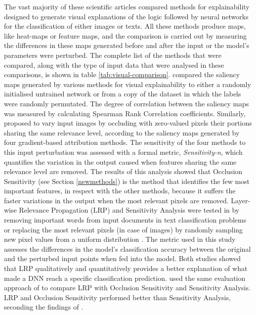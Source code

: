 \documentclass[final,1p,times]{elsarticle}
\begin{document}
The vast majority of these scientific articles compared methods for explainability designed to generate visual explanations of the logic followed by neural networks for the classification of either images or texts. All these methods produce maps, like heat-maps or feature maps, and the comparison is carried out by measuring the differences in these maps generated before and after the input or the model's parameters were perturbed. The complete list of the methods that were compared, along with the type of input data that were analysed in these comparisons, is shown in table \ref{tab:visual-comparison}.
\cite{adebayo2018local, adebayo2018sanity} compared the saliency maps generated by various methods for visual explainability to either a randomly initialised untrained network or from a copy of the dataset in which the labels were randomly permutated.
The degree of correlation between the saliency maps was measured by calculating  Spearman Rank Correlation coefficients.
Similarly, \cite{ancona2018towards} proposed to vary input images by occluding with zero-valued pixels their portions sharing the same relevance level, according to the saliency maps generated by four gradient-based attribution methods. The sensitivity of the four methods to this input perturbation was assessed with a formal metric, \textit{Sensitivity-n}, which quantifies the variation in the output caused when features sharing the same relevance level are removed. The results of this analysis showed that Occlusion Sensitivity (see Section \ref{newmethods}) is the method that identifies the few most important features, in respect with the other methods, because it suffers the faster variations in the output when the most relevant pixels are removed.
Layer-wise Relevance Propagation (LRP) and Sensitivity Analysis were tested in \cite{arras2016explaining, arras2017relevant, samek2017evaluating, samek2017explainable} by removing important words from input documents in text classification problems \cite{arras2016explaining, arras2017relevant} or replacing the most relevant pixels (in case of images) by randomly sampling new pixel values from a uniform distribution \cite{samek2017evaluating, samek2017explainable}. The metric used in this study assesses the differences in the model's classification accuracy between the original and the perturbed input points when fed into the model. Both studies showed that LRP qualitatively and quantitatively provides a better explanation of what made a DNN reach a specific classification prediction. \cite{binder2016analyzing} used the same evaluation approach of \cite{samek2017evaluating, samek2017explainable} to compare LRP with Occlusion Sensitivity and Sensitivity Analysis. LRP and Occlusion Sensitivity performed better than Sensitivity Analysis, seconding the findings of \cite{samek2017evaluating, samek2017explainable}.
\end{document}
